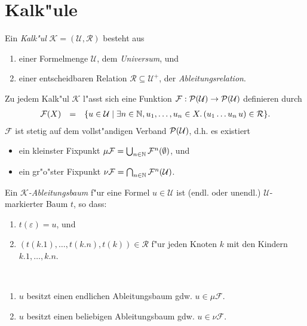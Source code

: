 \documentclass[12pt,a4paper,final]{article}
\begin{document}

\section{Kalk"ule}
\label{sec:Kalkuele}

\begin{definition}[Kalk"ul]
  Ein \emph{Kalk"ul} $\mathcal{K} = (\mathcal{U}, \mathcal{R})$ besteht aus
  \begin{enumerate}
  \item einer Formelmenge $\mathcal{U}$, dem \emph{Universum}, und
  \item einer entscheidbaren Relation $\mathcal{R} \subseteq \mathcal{U}^+$, der \emph{Ableitungsrelation}.
  \end{enumerate}
\end{definition}
Zu jedem Kalk"ul $\mathcal{K}$ l"asst sich eine Funktion
\mbox{$\mathcal{F}:\operatorname{\mathcal{P}}(\mathcal{U}) \to \operatorname{\mathcal{P}}(\mathcal{U})$} definieren durch
\[\begin{array}{rcl}
\mathcal{F}(X) &=& \{u \in \mathcal{U} \mid \exists n\in\mathbb N,u_1,\ldots,u_n\in X.\,(u_1 \ldots u_n\,u) \in\mathcal{R}\}.
\end{array}\]
$\mathcal{F}$ ist stetig auf dem vollst"andigen Verband $\operatorname{\mathcal{P}}(\mathcal{U})$, d.h. es
existiert
\begin{itemize}
\item ein kleinster Fixpunkt $\mu\mathcal{F} = \bigcup_{n\in\mathbb N}\mathcal{F}^n(\emptyset)$, und
\item ein gr"o"ster Fixpunkt $\nu\mathcal{F} = \bigcap_{n\in\mathbb N}\mathcal{F}^n(\mathcal{U})$.
\end{itemize}
Ein \emph{$\mathcal{K}$-Ableitungsbaum} f"ur eine Formel $u \in \mathcal{U}$ ist (endl. oder unendl.)
$\mathcal{U}$-markierter Baum $t$, so dass:
\begin{enumerate}
\item $t(\varepsilon) = u$, und
\item $(t(k.1),\ldots,t(k.n),t(k)) \in \mathcal{R}$ f"ur jeden Knoten $k$ mit den Kindern $k.1,\ldots,k.n$.
\end{enumerate}

\begin{theorem} \
  \begin{enumerate}
  \item $u$ besitzt einen endlichen Ableitungsbaum gdw. $u \in \mu\mathcal{F}$.
  \item $u$ besitzt einen beliebigen Ableitungsbaum gdw. $u \in \nu\mathcal{F}$.
  \end{enumerate}
\end{theorem}
\end{document}
